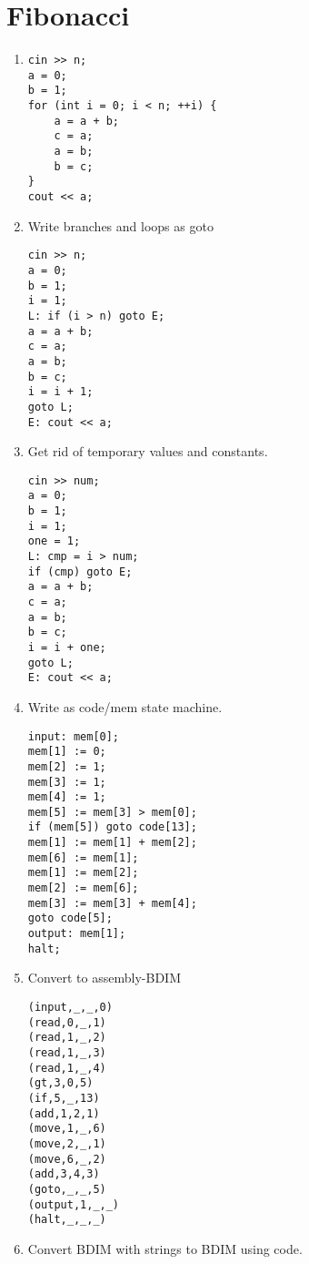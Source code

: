 \documentclass{scrartcl}
\begin{document}
\section{Fibonacci}
\begin{enumerate}
\item \begin{verbatim}
cin >> n;
a = 0;
b = 1;
for (int i = 0; i < n; ++i) {
	a = a + b;
	c = a;
	a = b;
	b = c;
}
cout << a;
\end{verbatim}

\item Write branches and loops as goto
\begin{verbatim}
cin >> n;
a = 0;
b = 1;
i = 1;
L: if (i > n) goto E;
a = a + b;
c = a;
a = b;
b = c;
i = i + 1;
goto L;
E: cout << a;
\end{verbatim}

\item Get rid of temporary values and constants.

\begin{verbatim}
cin >> num;
a = 0;
b = 1;
i = 1;
one = 1;
L: cmp = i > num;
if (cmp) goto E;
a = a + b;
c = a;
a = b;
b = c;
i = i + one;
goto L;
E: cout << a;
\end{verbatim}


\item Write as code/mem state machine.
\begin{verbatim}
input: mem[0];
mem[1] := 0;
mem[2] := 1;
mem[3] := 1;
mem[4] := 1;
mem[5] := mem[3] > mem[0];
if (mem[5]) goto code[13];
mem[1] := mem[1] + mem[2];
mem[6] := mem[1];
mem[1] := mem[2];
mem[2] := mem[6];
mem[3] := mem[3] + mem[4];
goto code[5];
output: mem[1];
halt;
\end{verbatim}

\item Convert to assembly-BDIM
\begin{verbatim}
(input,_,_,0)
(read,0,_,1)
(read,1,_,2)
(read,1,_,3)
(read,1,_,4)
(gt,3,0,5)
(if,5,_,13)
(add,1,2,1)
(move,1,_,6)
(move,2,_,1)
(move,6,_,2)
(add,3,4,3)
(goto,_,_,5)
(output,1,_,_)
(halt,_,_,_)
\end{verbatim}

\item Convert BDIM with strings to BDIM using code.
	\inputminted[linenos,firstnumber=0]{text}{bdim/fib.bdim}
\end{enumerate}
\end{document}
